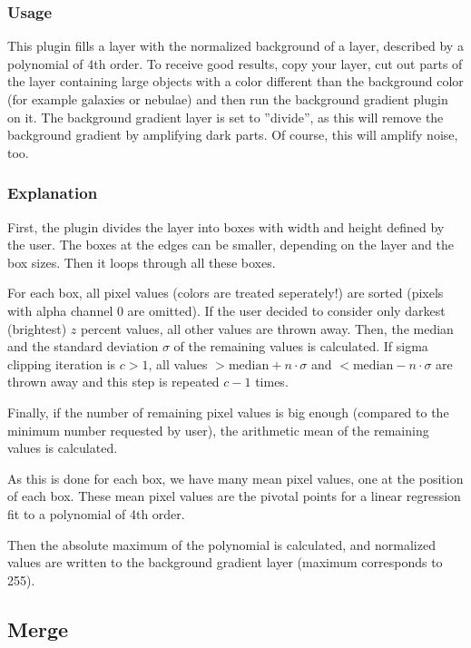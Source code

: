 \documentclass[a4paper]{article}
\begin{document}
\subsubsection{Usage}

This plugin fills a layer with the normalized background of a layer, described by a polynomial of 4th order.
To receive good results, copy your layer, cut out parts of the layer containing large objects with a color different than the background color (for example galaxies or nebulae) and then run the background gradient plugin on it.
The background gradient layer is set to ''divide'', as this will remove the background gradient by amplifying dark parts.
Of course, this will amplify noise, too.

\subsubsection{Explanation}

First, the plugin divides the layer into boxes with width and height defined by the user. The boxes at the edges can be smaller, depending on the layer and the box sizes.
Then it loops through all these boxes.

For each box, all pixel values (colors are treated seperately!) are sorted (pixels with alpha channel 0 are omitted).
If the user decided to consider only darkest (brightest) $z$ percent values, all other values are thrown away.
Then, the median and the standard deviation $\sigma$ of the remaining values is calculated.
If sigma clipping iteration is $c > 1$, all values $> \mathrm{median} + n \cdot \sigma$ and $< \mathrm{median} - n \cdot \sigma$ are thrown away and this step is repeated $c-1$ times.

Finally, if the number of remaining pixel values is big enough (compared to the minimum number requested by user), the arithmetic mean of the remaining values is calculated.

As this is done for each box, we have many mean pixel values, one at the position of each box.
These mean pixel values are the pivotal points for a linear regression fit to a polynomial of 4th order.

Then the absolute maximum of the polynomial is calculated, and normalized values are written to the background gradient layer (maximum corresponds to 255).

\subsection{Merge}
\end{document}
